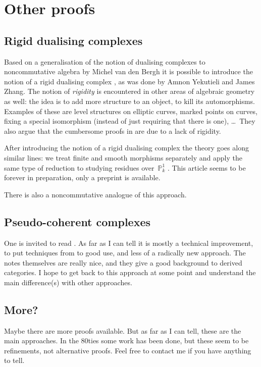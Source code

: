 \section{Other proofs}
\label{section:other}
\subsection{Rigid dualising complexes}
\label{subsection:yekutieli-zhang}
Based on a generalisation of the notion of dualising complexes to noncommutative algebra \cite{van-den-bergh-dualizing-complexes} by Michel van den Bergh it is possible to introduce the notion of a rigid dualising complex \cite{yekutieli-zhang-rigid-dualizing-complexes}, as was done by Amnon Yekutieli and James Zhang. The notion of \emph{rigidity} is encountered in other areas of algebraic geometry as well: the idea is to add more structure to an object, to kill its automorphisms. Examples of these are level structures on elliptic curves, marked points on curves, fixing a special isomorphism (instead of just requiring that there is one), \ldots\ They also argue that the cumbersome proofs in \cite{hartshorne-residues-and-duality} are due to a lack of rigidity.

After introducing the notion of a rigid dualising complex the theory goes along similar lines: we treat finite and smooth morphisms separately and apply the same type of reduction to studying residues over~$\mathbb{P}_k^1$ \cite{yekutieli-zhang-rigid-dualizing-complexes-on-schemes}. This article seems to be forever in preparation, only a preprint is available.

There is also a noncommutative analogue of this approach.

\subsection{Pseudo-coherent complexes}
\label{subsection:lipman}
One is invited to read \cite{lipman-notes-on-grothendieck-duality}. As far as I can tell it is mostly a technical improvement, to put techniques from \cite{sga6} to good use, and less of a radically new approach. The notes themselves are really nice, and they give a good background to derived categories. I hope to get back to this approach at some point and understand the main difference(s) with other approaches.

\subsection{More?}
Maybe there are more proofs available. But as far as I can tell, these are the main approaches. In the 80ties some work has been done, but these seem to be refinements, not alternative proofs. Feel free to contact me if you have anything to tell.


